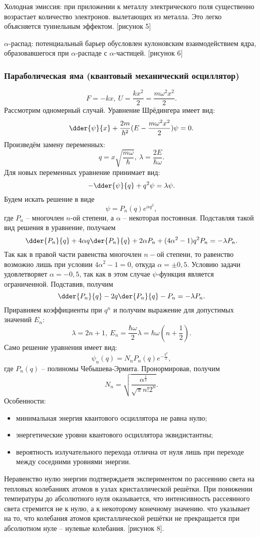 Холодная эмиссия: при приложении к металлу электрического поля существенно
возрастает количество электронов. вылетающих из металла. Это легко объясняется 
туннельным эффектом. [рисунок 5]

\( \alpha \)-распад: потенциальный барьер обусловлен кулоновским взаимодействием
ядра, образовавшегося при \( \alpha \)-распаде с \( \alpha \)-частицей.
[рисунок 6]

\subsubsection{Параболическая яма (квантовый механический осциллятор)}
\[
    F = -kx,\ U = \frac{kx^2}{2} = \frac{m\omega^2x^2}{2}.
\]
Рассмотрим одномерный случай. Уравнение Шрёдингера имеет вид:
\[
    \dder{\psi}{x} + \frac{2m}{\hbar^2}(E - \frac{m\omega^2x^2}{2})\psi = 0.
\]
Произведём замену переменных:
\[
    q = x\sqrt{\frac{m\omega}{\hbar}},\ \lambda = \frac{2E}{\hbar\omega}.
\]
Для новых переменных уравнение принимает вид:
\[
    -\dder{\psi}{q} + q^2\psi = \lambda\psi.
\]
Будем искать решение в виде
\[
    \psi = P_n(q)e^{\alpha q^2},
\]
где \( P_n \) -- многочлен \( n \)-ой степени, а \( \alpha \) -- некоторая
постоянная. Подставляя такой вид решения в уравнение, получаем
\[
    \dder{P_n}{q} + 4\alpha q\der{P_n}{q} + 2\alpha P_n + (4\alpha^2 -1)q^2P_n =
    -\lambda P_n.
\]
Так как в правой части равенства многочлен \( n-\text{ой} \) степени, то
равенство возможно лишь при условии \( 4\alpha^2 - 1 = 0 \), откуда
\( \alpha = \pm0,5 \). Условию задачи удовлетворяет \( \alpha = -0,5 \), так как
в этом случае \( \psi \)-функция является ограниченной. Подставив, получим
\[
    \dder{P_n}{q} - 2q\der{P_n}{q} - P_n = -\lambda P_n.
\]
Приравняем коэффициенты при \( q^n \) и получим выражение для допустимых
значений \( E_n \):
\[
    \lambda = 2n+1,\ E_n = \frac{\hbar\omega}{2}\lambda =
    \hbar\omega\left(n+\frac{1}{2}\right).
\]
Само решение уравнения имеет вид:
\[
    \psi_n(q) = N_nP_n(q)e^{-\frac{q^2}{2}},
\]
где \( P_n(q) \) -- полиномы Чебышева-Эрмита. Пронормировав, получим
\[
    N_n = \sqrt{\frac{\alpha^\frac{1}{2}}{\sqrt{\pi}n!2^n}}.
\]
Особенности:
\begin{itemize}
    \item минимальная энергия квантового осциллятора не равна нулю;
    \item энергетические уровни квантового осциллятора эквидистантны;
    \item вероятность излучательного перехода отлична от нуля лишь при переходе
    между соседними уровнями энергии.
\end{itemize}

Неравенство нулю энергии подтверждаетя экспериментом по рассеянию света на
тепловых колебаниях атомов в узлах кристаллической решётки. При понижении
температуры до абсолютного нуля оказывается, что интенсивность рассеянного света
стремится не к нулю, а к некоторому конечному значению. что указывает на то, что
колебания атомов кристаллической решётки не прекращается при абсолютном нуле -- 
нулевые колебания.
[рисунок 8].